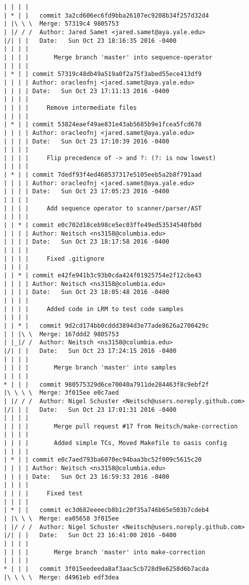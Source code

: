 \begin{lstlisting}
| | | |       
| * | |   commit 3a2cd606ec6fd9bba26107ec9208b34f257d32d4
| |\ \ \  Merge: 57319c4 9805753
| |/ / /  Author: Jared Samet <jared.samet@aya.yale.edu>
|/| | |   Date:   Sun Oct 23 18:16:35 2016 -0400
| | | |   
| | | |       Merge branch 'master' into sequence-operator
| | | |     
| * | | commit 57319c48db49a519a0f2a75f3abed55ece413df9
| | | | Author: oracleofnj <jared.samet@aya.yale.edu>
| | | | Date:   Sun Oct 23 17:11:13 2016 -0400
| | | | 
| | | |     Remove intermediate files
| | | |     
| * | | commit 53824eaef49ae831e43ab5685b9e1fcea5fcd678
| | | | Author: oracleofnj <jared.samet@aya.yale.edu>
| | | | Date:   Sun Oct 23 17:10:39 2016 -0400
| | | | 
| | | |     Flip precedence of -> and ?: (?: is now lowest)
| | | |     
| * | | commit 7dedf93f4ed468537317e5105eeb5a2b8f791aad
| | | | Author: oracleofnj <jared.samet@aya.yale.edu>
| | | | Date:   Sun Oct 23 17:05:23 2016 -0400
| | | | 
| | | |     Add sequence operator to scanner/parser/AST
| | | |     
| | * | commit e0c702d18ceb98ce5ec03ffe49ed53534540fb0d
| | | | Author: Neitsch <ns3158@columbia.edu>
| | | | Date:   Sun Oct 23 18:17:58 2016 -0400
| | | | 
| | | |     Fixed .gitignore
| | | |     
| | * | commit e42fe941b3c93b0cda424f01925754e2f12cbe43
| | | | Author: Neitsch <ns3158@columbia.edu>
| | | | Date:   Sun Oct 23 18:05:48 2016 -0400
| | | | 
| | | |     Added code in LRM to test code samples
| | | |       
| | * |   commit 9d2cd174bb0cddd3894d3e77ade8626a2700429c
| | |\ \  Merge: 167ddd2 9805753
| |_|/ /  Author: Neitsch <ns3158@columbia.edu>
|/| | |   Date:   Sun Oct 23 17:24:15 2016 -0400
| | | |   
| | | |       Merge branch 'master' into samples
| | | |       
* | | |   commit 980575329d6ce70040a7911de284463f8c9ebf2f
|\ \ \ \  Merge: 3f015ee e0c7aed
| |/ / /  Author: Nigel Schuster <Neitsch@users.noreply.github.com>
|/| | |   Date:   Sun Oct 23 17:01:31 2016 -0400
| | | |   
| | | |       Merge pull request #17 from Neitsch/make-correction
| | | |       
| | | |       Added simple TCs, Moved Makefile to oasis config
| | | |     
| * | | commit e0c7aed793ba6070ec94baa3bc52f009c5615c20
| | | | Author: Neitsch <ns3158@columbia.edu>
| | | | Date:   Sun Oct 23 16:59:33 2016 -0400
| | | | 
| | | |     Fixed test
| | | |       
| * | |   commit ec3d682eeeecb8b1c20f35a746b65e503b7cdeb4
| |\ \ \  Merge: ea05658 3f015ee
| |/ / /  Author: Nigel Schuster <Neitsch@users.noreply.github.com>
|/| | |   Date:   Sun Oct 23 16:41:00 2016 -0400
| | | |   
| | | |       Merge branch 'master' into make-correction
| | | |       
* | | |   commit 3f015eedeeda8af3aac5cb728d9e6258d6b7acda
|\ \ \ \  Merge: d4961eb edf3dea

\end{lstlisting}
